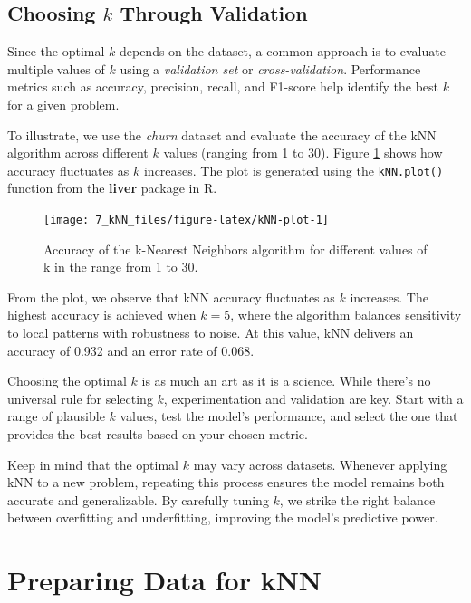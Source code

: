\documentclass[
  11pt,
]{book}
\theoremstyle{definition}
\theoremstyle{definition}
\theoremstyle{definition}
\theoremstyle{definition}
\theoremstyle{remark}
\begin{document}
\subsection*{\texorpdfstring{Choosing \(k\) Through Validation}{Choosing k Through Validation}}\label{choosing-k-through-validation}


Since the optimal \(k\) depends on the dataset, a common approach is to evaluate multiple values of \(k\) using a \emph{validation set} or \emph{cross-validation}. Performance metrics such as accuracy, precision, recall, and F1-score help identify the best \(k\) for a given problem.

To illustrate, we use the \emph{churn} dataset and evaluate the accuracy of the kNN algorithm across different \(k\) values (ranging from 1 to 30). Figure \ref{fig:kNN-plot} shows how accuracy fluctuates as \(k\) increases. The plot is generated using the \texttt{kNN.plot()} function from the \textbf{liver} package in R.

\begin{figure}[H]

{\centering \texttt{[image: 7\_kNN\_files/figure-latex/kNN-plot-1]} 

}

\caption{Accuracy of the k-Nearest Neighbors algorithm for different values of k in the range from 1 to 30.}\label{fig:kNN-plot}
\end{figure}

From the plot, we observe that kNN accuracy fluctuates as \(k\) increases. The highest accuracy is achieved when \(k = 5\), where the algorithm balances sensitivity to local patterns with robustness to noise. At this value, kNN delivers an accuracy of 0.932 and an error rate of 0.068.

Choosing the optimal \(k\) is as much an art as it is a science. While there's no universal rule for selecting \(k\), experimentation and validation are key. Start with a range of plausible \(k\) values, test the model's performance, and select the one that provides the best results based on your chosen metric.

Keep in mind that the optimal \(k\) may vary across datasets. Whenever applying kNN to a new problem, repeating this process ensures the model remains both accurate and generalizable. By carefully tuning \(k\), we strike the right balance between overfitting and underfitting, improving the model's predictive power.

\section{Preparing Data for kNN}\label{preparing-data-for-knn}
\end{document}

